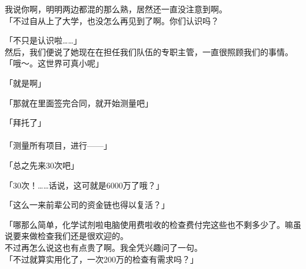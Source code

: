 我说你啊，明明两边都混的那么熟，居然还一直没注意到啊。\\

「不过自从上了大学，也没怎么再见到了啊。你们认识吗？

「不只是认识啦……」\\

然后，我们便说了她现在在担任我们队伍的专职主管，一直很照顾我们的事情。\\

「哦～。这世界可真小呢」

「就是啊」

「那就在里面签完合同，就开始测量吧」

「拜托了」\\

\sqsplit\\

「测量所有项目，进行——」

「总之先来30次吧」

「30次！……话说，这可就是6000万了哦？」

「这么一来前辈公司的资金链也得以复活？」

「哪那么简单，化学试剂啦电脑使用费啦收的检查费付完这些也不剩多少了。嘛虽说要来做检查我们还是很欢迎的。\\

不过再怎么说这也有点贵了啊。我全凭兴趣问了一句。\\

「不过就算实用化了，一次200万的检查有需求吗？」

